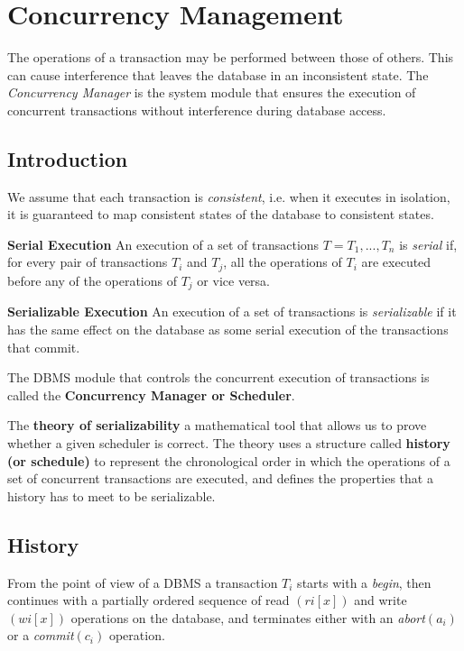 \chapter{Concurrency Management}
The operations of a transaction may be performed between those of others. This can cause interference that leaves the database in an inconsistent state. The \textit{Concurrency Manager} is the system module that ensures the execution of concurrent transactions without interference during database access.

\section{Introduction}
We assume that each transaction is \textit{consistent}, i.e. when it executes in isolation, it is guaranteed to map consistent states of the database to consistent states.

\begin{tcolorbox}
\textbf{Serial Execution} An execution of a set of transactions $T = {T_1, ..., T_n}$ is \textit{serial} if, for every pair of transactions $T_i$ and $T_j$, all the operations of $T_i$ are executed before any of the operations of $T_j$ or vice versa.
\end{tcolorbox}

\begin{tcolorbox}
\textbf{Serializable Execution} An execution of a set of transactions is \textit{serializable} if it has the same effect on the database as some serial execution of the transactions that commit.
\end{tcolorbox}

The DBMS module that controls the concurrent execution of transactions is called the \textbf{Concurrency Manager or Scheduler}.

The \textbf{theory of serializability} a mathematical tool that allows us to prove whether a given scheduler is correct. The theory uses a structure called \textbf{history (or schedule)} to represent the chronological order in which the operations of a set of concurrent transactions are executed, and defines the properties that a history has to meet to be serializable.

\section{History}
From the point of view of a DBMS a transaction $T_i$ starts with a \textit{begin}, then continues with a partially ordered sequence of read $(ri[x])$ and write $(wi[x])$ operations on the database, and terminates either with an \textit{abort}$(a_i)$ or a \textit{commit}$(c_i)$ operation.

